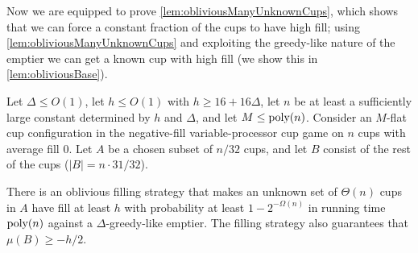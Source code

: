 Now we are equipped to prove \cref{lem:obliviousManyUnknownCups}, which shows
that we can force a constant fraction of the cups to have high
fill; using \cref{lem:obliviousManyUnknownCups} and exploiting the greedy-like nature of
the emptier we can get a known cup with high fill
(we show this in \cref{lem:obliviousBase}).
\begin{lemma}
  \label{lem:obliviousManyUnknownCups}
  Let $\Delta \le O(1)$, let $h \le O(1)$ with $h \ge 16+16\Delta$, let
  $n$ be at least a sufficiently large constant
  determined by $h$ and $\Delta$, and let $M \le \operatorname{\text{poly}}(n)$.
  Consider an $M$-flat cup configuration in the negative-fill
  variable-processor cup game on $n$ cups with average fill $0$.
  Let $A$ be a chosen subset of $n/32$ cups, and let $B$ consist
  of the rest of the cups ($|B| = n\cdot 31/32$).

  There is an oblivious filling strategy that makes an unknown
  set of $\Theta(n)$ cups in $A$ have fill at least $h$ with
  probability at least $1-2^{-\Omega(n)}$ in running time
  $\operatorname{\text{poly}}(n)$ against a $\Delta$-greedy-like emptier.
  The filling strategy also guarantees that $\mu(B) \ge -h/2$.
\end{lemma}

